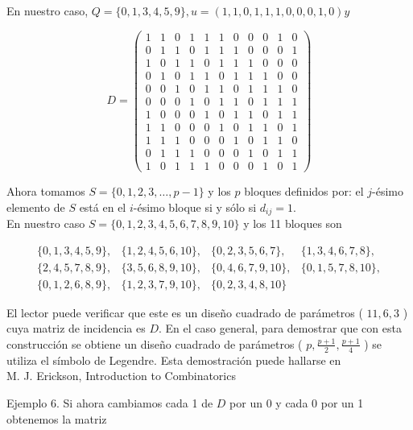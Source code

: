 \documentclass[10pt]{article}
\begin{document}
En nuestro caso, $Q=\{0,1,3,4,5,9\}, u=(1,1,0,1,1,1,0,0,0,1,0) y$

$$
D=\left(\begin{array}{lllllllllll}
1 & 1 & 0 & 1 & 1 & 1 & 0 & 0 & 0 & 1 & 0 \\
0 & 1 & 1 & 0 & 1 & 1 & 1 & 0 & 0 & 0 & 1 \\
1 & 0 & 1 & 1 & 0 & 1 & 1 & 1 & 0 & 0 & 0 \\
0 & 1 & 0 & 1 & 1 & 0 & 1 & 1 & 1 & 0 & 0 \\
0 & 0 & 1 & 0 & 1 & 1 & 0 & 1 & 1 & 1 & 0 \\
0 & 0 & 0 & 1 & 0 & 1 & 1 & 0 & 1 & 1 & 1 \\
1 & 0 & 0 & 0 & 1 & 0 & 1 & 1 & 0 & 1 & 1 \\
1 & 1 & 0 & 0 & 0 & 1 & 0 & 1 & 1 & 0 & 1 \\
1 & 1 & 1 & 0 & 0 & 0 & 1 & 0 & 1 & 1 & 0 \\
0 & 1 & 1 & 1 & 0 & 0 & 0 & 1 & 0 & 1 & 1 \\
1 & 0 & 1 & 1 & 1 & 0 & 0 & 0 & 1 & 0 & 1
\end{array}\right)
$$

Ahora tomamos $S=\{0,1,2,3, \ldots, p-1\}$ y los $p$ bloques definidos por: el $j$-ésimo elemento de $S$ está en el $i$-ésimo bloque si y sólo si $d_{i j}=1$.\\
En nuestro caso $S=\{0,1,2,3,4,5,6,7,8,9,10\}$ y los 11 bloques son

$$
\begin{array}{llll}
\{0,1,3,4,5,9\}, & \{1,2,4,5,6,10\}, & \{0,2,3,5,6,7\}, & \{1,3,4,6,7,8\}, \\
\{2,4,5,7,8,9\}, & \{3,5,6,8,9,10\}, & \{0,4,6,7,9,10\}, & \{0,1,5,7,8,10\}, \\
\{0,1,2,6,8,9\}, & \{1,2,3,7,9,10\}, & \{0,2,3,4,8,10\} &
\end{array}
$$

El lector puede verificar que este es un diseño cuadrado de parámetros ( $11,6,3$ ) cuya matriz de incidencia es $D$. En el caso general, para demostrar que con esta construcción se obtiene un diseño cuadrado de parámetros ( $p, \frac{p+1}{2}, \frac{p+1}{4}$ ) se utiliza el símbolo de Legendre. Esta demostración puede hallarse en\\
M. J. Erickson, Introduction to Combinatorics

Ejemplo 6. Si ahora cambiamos cada 1 de $D$ por un 0 y cada 0 por un 1 obtenemos la matriz
\end{document}
